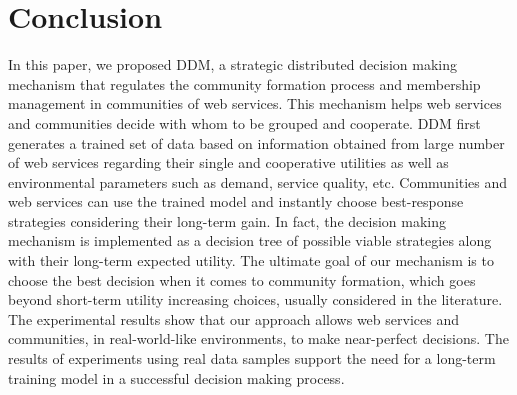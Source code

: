 \documentclass[11pt,onecolumn]{IEEEtran}
\begin{document}
{%
%







\section{Conclusion}\label{s:conclusion}

In this paper, we proposed DDM, a strategic distributed decision making mechanism that regulates the community formation process and  membership management in communities of web services. This mechanism helps web services and communities decide with whom to be grouped and cooperate. DDM first generates a trained set of data based on information obtained from large number of web services regarding their single and cooperative utilities as well as environmental parameters such as demand, service quality, etc. Communities and web services can use the trained model and instantly choose best-response strategies considering their long-term gain. In fact, the decision making mechanism is implemented as a decision tree of possible viable strategies along with their long-term expected utility. The ultimate goal of our mechanism is to choose the best decision when it comes to community formation, which goes beyond short-term utility increasing choices, usually considered in the literature. The experimental results show that our approach allows web services and communities, in real-world-like environments, to make near-perfect decisions. The results of experiments using real data samples support the need for a long-term training model in a successful decision making process.




}
\end{document}
